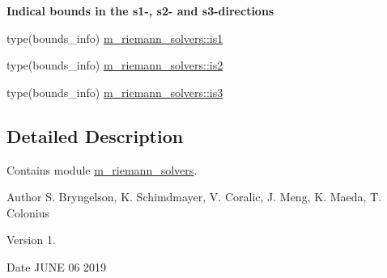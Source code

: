 \begin{Indent}\textbf{ Indical bounds in the s1-\/, s2-\/ and s3-\/directions}\par
\begin{DoxyCompactItemize}
\item 
type(bounds\+\_\+info) \hyperlink{namespacem__riemann__solvers_ad7ef4f9e239961cacd291ee2e31bf0be}{m\+\_\+riemann\+\_\+solvers\+::is1}
\item 
type(bounds\+\_\+info) \hyperlink{namespacem__riemann__solvers_ad0d94c92ddccee51dc2412707fcab447}{m\+\_\+riemann\+\_\+solvers\+::is2}
\item 
type(bounds\+\_\+info) \hyperlink{namespacem__riemann__solvers_a90256be0540e3f9279305be0e9ab32f4}{m\+\_\+riemann\+\_\+solvers\+::is3}
\end{DoxyCompactItemize}
\end{Indent}


\subsection{Detailed Description}
Contains module \hyperlink{namespacem__riemann__solvers}{m\+\_\+riemann\+\_\+solvers}. 

\begin{DoxyAuthor}{Author}
S. Bryngelson, K. Schimdmayer, V. Coralic, J. Meng, K. Maeda, T. Colonius 
\end{DoxyAuthor}
\begin{DoxyVersion}{Version}
1. 
\end{DoxyVersion}
\begin{DoxyDate}{Date}
J\+U\+NE 06 2019 
\end{DoxyDate}
